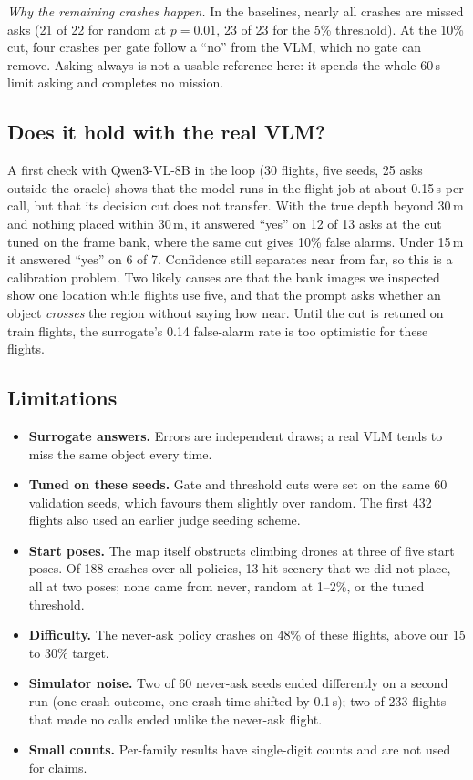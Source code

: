 \emph{Why the remaining crashes happen.} In the baselines, nearly all crashes are missed asks (21 of 22 for random at
$p=0.01$, 23 of 23 for the 5\% threshold). At the 10\% cut, four crashes per gate follow a ``no'' from the VLM,
which no gate can remove. Asking always is not a usable reference here: it spends the whole 60\,s limit asking and
completes no mission.

\subsection{Does it hold with the real VLM?}

A first check with Qwen3-VL-8B in the loop (30 flights, five seeds, 25 asks outside the oracle) shows that the model
runs in the flight job at about 0.15\,s per call, but that its decision cut does not transfer. With the true
depth beyond 30\,m and nothing placed within 30\,m, it answered ``yes'' on 12 of 13 asks at the cut tuned on the frame
bank, where the same cut gives 10\% false alarms. Under 15\,m it answered ``yes'' on 6 of 7. Confidence still
separates near from far, so this is a calibration problem. Two likely causes are that the bank images we inspected
show one location while flights use five, and that the prompt asks whether an object \emph{crosses} the region
without saying how near. Until the cut is retuned on train flights, the surrogate's 0.14 false-alarm rate is
too optimistic for these flights. 

\subsection{Limitations}
\label{sec:gate-limits}
\begin{itemize}
\item \textbf{Surrogate answers.} Errors are independent draws; a real VLM tends to miss the same object every time.
\item \textbf{Tuned on these seeds.} Gate and threshold cuts were set on the same 60 validation seeds,
      which favours them slightly over random. The first 432 flights also used an earlier judge seeding scheme.
\item \textbf{Start poses.} The map itself obstructs climbing drones at three of five start poses. Of 188 crashes over all
      policies, 13 hit scenery that we did not place, all at two poses; none came from never, random at 1--2\%, or the tuned threshold.
\item \textbf{Difficulty.} The never-ask policy crashes on 48\% of these flights, above our 15 to 30\% target.
\item \textbf{Simulator noise.} Two of 60 never-ask seeds ended differently on a second run (one crash outcome, one
      crash time shifted by 0.1\,s); two of 233 flights that made no calls ended unlike the never-ask flight.
\item \textbf{Small counts.} Per-family results have single-digit counts and are not used for claims.
\end{itemize}

